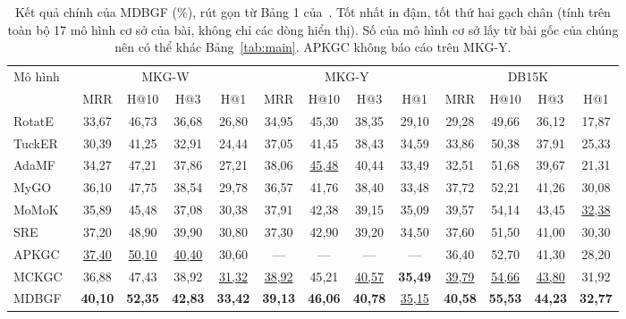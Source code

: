 \documentclass[conference,a4paper]{IEEEtran}
\begin{document}
\begin{table}[t]
\centering
\caption{Kết quả chính của MDBGF (\%), rút gọn từ Bảng 1 của~\cite{mdbgf}. Tốt nhất in đậm, tốt thứ hai gạch chân (tính trên toàn bộ 17 mô hình cơ sở của bài, không chỉ các dòng hiển thị). Số của mô hình cơ sở lấy từ bài gốc của chúng nên có thể khác Bảng~\ref{tab:main}. APKGC không báo cáo trên MKG-Y.}
\label{tab:mdbgf-main}
\footnotesize
\setlength{\tabcolsep}{4.5pt}
\begin{tabular}{l cccc cccc cccc}
\toprule
\multirow{2}{*}{Mô hình} & \multicolumn{4}{c}{MKG-W} & \multicolumn{4}{c}{MKG-Y} & \multicolumn{4}{c}{DB15K}\\
\cmidrule(lr){2-5}\cmidrule(lr){6-9}\cmidrule(lr){10-13}
 & MRR & H@10 & H@3 & H@1 & MRR & H@10 & H@3 & H@1 & MRR & H@10 & H@3 & H@1\\
\midrule
RotatE~\cite{rotate}   & 33{,}67 & 46{,}73 & 36{,}68 & 26{,}80 & 34{,}95 & 45{,}30 & 38{,}35 & 29{,}10 & 29{,}28 & 49{,}66 & 36{,}12 & 17{,}87 \\
TuckER~\cite{tucker}   & 30{,}39 & 41{,}25 & 32{,}91 & 24{,}44 & 37{,}05 & 41{,}45 & 38{,}43 & 34{,}59 & 33{,}86 & 50{,}38 & 37{,}91 & 25{,}33 \\
AdaMF~\cite{adamf}     & 34{,}27 & 47{,}21 & 37{,}86 & 27{,}21 & 38{,}06 & \underline{45{,}48} & 40{,}44 & 33{,}49 & 32{,}51 & 51{,}68 & 39{,}67 & 21{,}31 \\
MyGO~\cite{mygo}       & 36{,}10 & 47{,}75 & 38{,}54 & 29{,}78 & 36{,}57 & 41{,}76 & 38{,}40 & 33{,}48 & 37{,}72 & 52{,}21 & 41{,}26 & 30{,}08 \\
MoMoK~\cite{momok}     & 35{,}89 & 45{,}48 & 37{,}08 & 30{,}38 & 37{,}91 & 42{,}38 & 39{,}15 & 35{,}09 & 39{,}57 & 54{,}14 & 43{,}45 & \underline{32{,}38} \\
SRE~\cite{sre}         & 37{,}20 & 48{,}90 & 39{,}90 & 30{,}80 & 37{,}30 & 42{,}90 & 39{,}20 & 34{,}50 & 37{,}60 & 51{,}50 & 41{,}00 & 30{,}30 \\
APKGC~\cite{apkgc}     & \underline{37{,}40} & \underline{50{,}10} & \underline{40{,}40} & 30{,}60 & --- & --- & --- & --- & 36{,}40 & 52{,}70 & 41{,}30 & 28{,}20 \\
MCKGC~\cite{mckgc}     & 36{,}88 & 47{,}43 & 38{,}92 & \underline{31{,}32} & \underline{38{,}92} & 45{,}21 & \underline{40{,}57} & \textbf{35{,}49} & \underline{39{,}79} & \underline{54{,}66} & \underline{43{,}80} & 31{,}92 \\
\midrule
MDBGF~\cite{mdbgf}     & \textbf{40{,}10} & \textbf{52{,}35} & \textbf{42{,}83} & \textbf{33{,}42} & \textbf{39{,}13} & \textbf{46{,}06} & \textbf{40{,}78} & \underline{35{,}15} & \textbf{40{,}58} & \textbf{55{,}53} & \textbf{44{,}23} & \textbf{32{,}77} \\
\bottomrule
\end{tabular}
\end{table}
\end{document}
